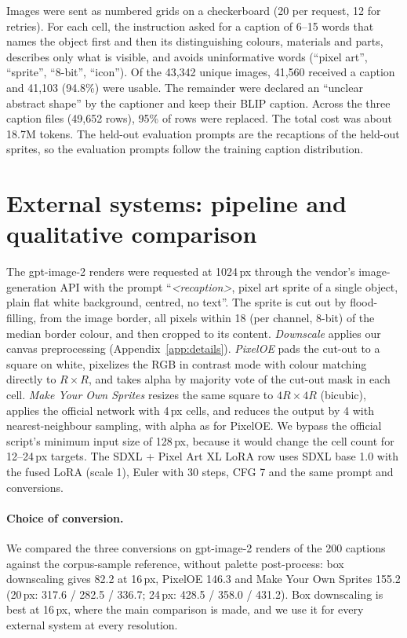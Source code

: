 Images were sent as numbered grids on a checkerboard (20 per request, 12 for retries). For each cell, the instruction
asked for a caption of 6--15 words that names the object first and then its distinguishing colours, materials and
parts, describes only what is visible, and avoids uninformative words (``pixel art'', ``sprite'', ``8-bit'', ``icon'').
Of the 43,342 unique images, 41,560 received a caption and 41,103 (94.8\%) were usable. The remainder were declared an
``unclear abstract shape'' by the captioner and keep their BLIP \citep{Li2022blip} caption. Across the three caption files (49,652 rows),
95\% of rows were replaced. The total cost was about 18.7M tokens. The held-out evaluation prompts are the recaptions of
the held-out sprites, so the evaluation prompts follow the training caption distribution.

\section{External systems: pipeline and qualitative comparison}
\label{app:externalfig}

The gpt-image-2 \citep{GPTImage2} renders were requested at 1024\,px through the vendor's image-generation API with the
prompt ``\emph{<recaption>}, pixel art sprite of a single object, plain flat white background, centred, no text''. The
sprite is cut out by flood-filling, from the image border, all pixels within 18 (per channel, 8-bit) of the median border
colour, and then cropped to its content. \emph{Downscale} applies our canvas preprocessing (Appendix~\ref{app:details}).
\emph{PixelOE} pads the cut-out to a square on white, pixelizes the RGB in contrast mode with colour matching directly to
$R\times R$, and takes alpha by majority vote of the cut-out mask in each cell. \emph{Make Your Own Sprites} resizes the
same square to $4R\times4R$ (bicubic), applies the official network with 4\,px cells, and reduces the output by 4 with
nearest-neighbour sampling, with alpha as for PixelOE. We bypass the official script's minimum input size of 128\,px,
because it would change the cell count for 12--24\,px targets. The SDXL + Pixel Art XL LoRA row uses SDXL base 1.0 with
the fused LoRA (scale 1), Euler with 30 steps, CFG 7 and the same prompt and conversions.

\paragraph{Choice of conversion.} We compared the three conversions on gpt-image-2 renders of the 200 captions against
the corpus-sample reference, without palette post-process: box downscaling gives 82.2 at 16\,px, PixelOE 146.3 and
Make Your Own Sprites 155.2 (20\,px: 317.6 / 282.5 / 336.7; 24\,px: 428.5 / 358.0 / 431.2). Box downscaling is best at
16\,px, where the main comparison is made, and we use it for every external system at every resolution.

